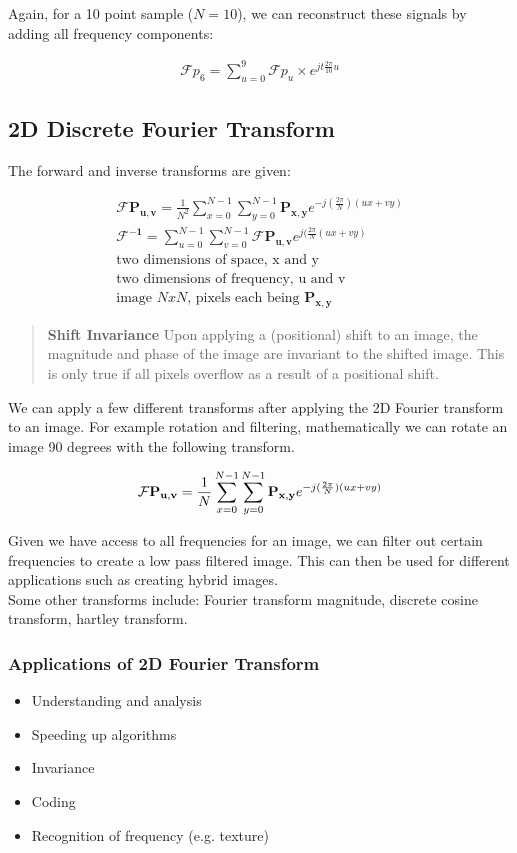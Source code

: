 Again, for a 10 point sample ($N=10$), we can reconstruct these signals by adding all frequency components:

\begin{align}
    \mathcal{F}p_{6} = \sum_{u=0}^{9}\mathcal{F}p_{u}\times e^{jt\frac{2\pi}{10}u}
\end{align}
\newpage

\subsection{2D Discrete Fourier Transform}
The forward and inverse transforms are given:

\begin{align}
    \mathbf{\mathcal{F} P_{u,v}} = \frac{1}{N^{2}}\sum_{x=0}^{N-1}\sum_{y=0}^{N-1}\mathbf{P_{x,y}}e^{-j(\frac{2\pi}{N})(ux+vy)} \\
    \mathbf{\mathcal{F}^{-1}} = \sum_{u=0}^{N-1}\sum_{v=0}^{N-1}\mathbf{\mathcal{F}P_{u,v}}e^{j(\frac{2\pi}{N}(ux+vy)}\\
    \text{two dimensions of space, x and y} \\
    \text{two dimensions of frequency, u and v} \\
    \text{image $NxN$, pixels each being } \mathbf{P_{x,y}} 
\end{align}

\begin{quote}
    \textbf{Shift Invariance} Upon applying a (positional) shift to an image, the magnitude and phase of the image are invariant to the shifted image. This is only true if all pixels overflow as a result of a positional shift.
\end{quote}

We can apply a few different transforms after applying the 2D Fourier transform to an image. For example rotation and filtering, mathematically we can rotate an image 90 degrees with the following transform.

\begin{equation}
    \mathbf{\mathcal{F} P_{u,v}} = \frac{1}{N}\sum_{x=0}^{N-1}\sum_{y=0}^{N-1}\mathbf{P_{x,y}}e^{-j(\frac{2\pi}{N})(ux+vy)} \\
\end{equation}

Given we have access to all frequencies for an image, we can filter out certain frequencies to create a low pass filtered image. This can then be used for different applications such as creating hybrid images.
\\
Some other transforms include: Fourier transform magnitude, discrete cosine transform, hartley transform.

\subsubsection{Applications of 2D Fourier Transform}
\begin{itemize}
    \itemsep0em
    \item Understanding and analysis
    \item Speeding up algorithms
    \item Invariance
    \item Coding
    \item Recognition of frequency (e.g. texture)
\end{itemize}

